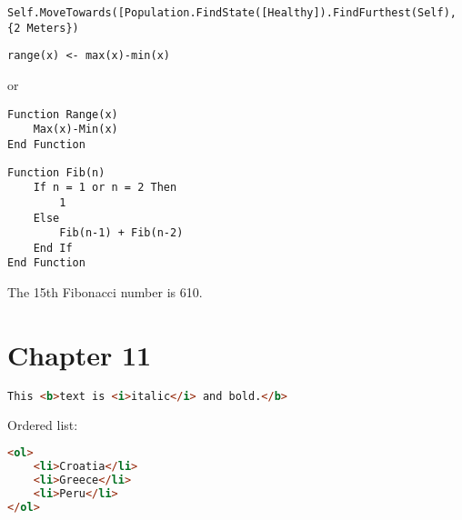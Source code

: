 \documentclass[]{memoir}
\begin{document}
\lstinline!Self.MoveTowards([Population.FindState([Healthy]).FindFurthest(Self), {2 Meters})!


\lstinline!range(x) <- max(x)-min(x)!

or

\begin{lstlisting}
Function Range(x)
    Max(x)-Min(x)
End Function
\end{lstlisting}


\begin{lstlisting}
Function Fib(n)
    If n = 1 or n = 2 Then
        1
    Else
        Fib(n-1) + Fib(n-2)
    End If
End Function
\end{lstlisting}

The 15th Fibonacci number is 610.

\section{Chapter 11}


\begin{lstlisting}[language=HTML]
This <b>text is <i>italic</i> and bold.</b>
\end{lstlisting}


Ordered list:

\begin{lstlisting}[language=HTML]
<ol>
    <li>Croatia</li>
    <li>Greece</li>
    <li>Peru</li>
</ol>
\end{lstlisting}
\end{document}
